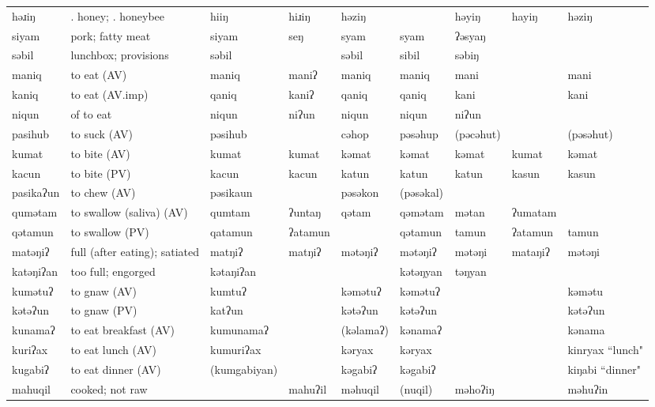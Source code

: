 \begin{landscape}
\begin{longtable}{*{9}{>{\raggedright\arraybackslash}p{}}}
\text{*}həɹiŋ & 1. honey; \newline 2. honeybee & hiiŋ & hiɹiŋ & həziŋ &  & həyiŋ & hayiŋ & həziŋ\\
\text{*}siyam & pork; fatty meat & siyam & seŋ & syam & syam & ʔəsyaŋ &  & \\
\text{*}səbil & lunchbox; provisions & səbil &  & səbil & sibil & səbiŋ &  & \\
\text{*}maniq & to eat (AV) & maniq & maniʔ & maniq & maniq & mani &  & mani\\
\text{*}kaniq & to eat (AV.imp) & qaniq & kaniʔ & qaniq & qaniq & kani &  & kani\\
\text{*}niqun & of to eat & niqun & niʔun & niqun & niqun & niʔun &  & \\
\text{*}pasihub & to suck (AV) & pəsihub &  & cəhop & pəsəhup & (pəcəhut) &  & (pəsəhut)\\
\text{*}kumat & to bite (AV) & kumat & kumat & kəmat & kəmat & kəmat & kumat & kəmat\\
\text{*}kacun & to bite (PV) & kacun & kacun & katun & katun & katun & kasun & kasun\\
\text{*}pasikaʔun & to chew (AV) & pəsikaun &  & pəsəkon & (pəsəkal) &  &  & \\
\text{*}qumətam & to swallow (saliva) (AV) & qumtam & ʔuntaŋ & qətam & qəmətam & mətan & ʔumatam & \\
\text{*}qətamun & to swallow (PV) & qatamun & ʔatamun &  & qətamun & tamun & ʔatamun & tamun\\
\text{*}matəŋiʔ & full (after eating); satiated & matŋiʔ & matŋiʔ & mətəŋiʔ & mətəŋiʔ & mətəŋi & mataŋiʔ & mətəŋi\\
\text{*}katəŋiʔan & too full; engorged & kətaŋiʔan &  &  & kətəŋyan & təŋyan &  & \\
\text{*}kumətuʔ & to gnaw (AV) & kumtuʔ &  & kəmətuʔ & kəmətuʔ &  &  & kəmətu\\
\text{*}kətəʔun & to gnaw (PV) & katʔun &  & kətəʔun & kətəʔun &  &  & kətəʔun\\
\text{*}kunamaʔ & to eat breakfast (AV) & kumunamaʔ &  & (kəlamaʔ) & kənamaʔ &  &  & kənama\\
\text{*}kuriʔax & to eat lunch (AV) & kumuriʔax &  & kəryax & kəryax &  &  & kinryax ``lunch"\\
\text{*}kugabiʔ & to eat dinner (AV) & (kumgabiyan) &  & kəgabiʔ & kəgabiʔ &  &  & kiŋabi \newline ``dinner"\\
\text{*}mahuqil & cooked; not raw &  & mahuʔil & məhuqil & (nuqil) & məhoʔiŋ &  & məhuʔin\\

\end{longtable}
\end{landscape}
